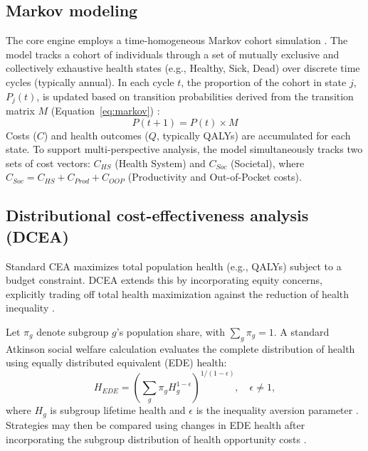 \documentclass[article]{jss}
\begin{document}
\subsection{Markov modeling}
The core engine employs a time-homogeneous Markov cohort simulation \citep{briggs1998}. The model tracks a cohort of individuals through a set of mutually exclusive and collectively exhaustive health states (e.g., Healthy, Sick, Dead) over discrete time cycles (typically annual).
In each cycle $t$, the proportion of the cohort in state $j$, $P_j(t)$, is updated based on transition probabilities derived from the transition matrix $M$ (Equation~\ref{eq:markov}) \citep{briggs1998}:
\begin{equation} \label{eq:markov}
P(t+1) = P(t) \times M
\end{equation}
Costs ($C$) and health outcomes ($Q$, typically QALYs) are accumulated for each state. To support multi-perspective analysis, the model simultaneously tracks two sets of cost vectors: $C_{HS}$ (Health System) and $C_{Soc}$ (Societal), where $C_{Soc} = C_{HS} + C_{Prod} + C_{OOP}$ (Productivity and Out-of-Pocket costs).

\subsection{Distributional cost-effectiveness analysis (DCEA)}
Standard CEA maximizes total population health (e.g., QALYs) subject to a budget constraint. DCEA extends this by incorporating equity concerns, explicitly trading off total health maximization against the reduction of health inequality \citep{cookson2017}.

Let $\pi_g$ denote subgroup $g$'s population share, with
$\sum_g\pi_g=1$. A standard Atkinson social welfare calculation evaluates
the complete distribution of health using equally distributed equivalent
(EDE) health:
\begin{equation} \label{eq:nmb_eq}
H_{EDE}=\left(\sum_g \pi_g H_g^{1-\epsilon}\right)^{1/(1-\epsilon)},
\quad \epsilon\ne1,
\end{equation}
where $H_g$ is subgroup lifetime health and $\epsilon$ is the inequality
aversion parameter \citep{atkinson1970,asaria2016}. Strategies may then be
compared using changes in EDE health after incorporating the subgroup
distribution of health opportunity costs \citep{cookson2017,lovekoh2019}.
\end{document}
